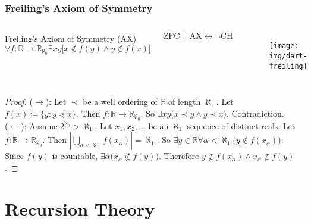 \documentclass[UTF8,11pt,colorlinks,compress,openany]{beamer}%
\begin{document}
\begin{frame}\frametitle{Freiling's Axiom of Symmetry}
\begin{columns}
\begin{block}{Freiling's Axiom of Symmetry (AX)}
\[\forall f:\mathbb{R}\to\mathbb{R}_{\aleph_0}\exists xy\big[x\notin f(y)\wedge y\notin f(x)\big]\]
\end{block}
\begin{theorem}
\[\mathrm{ZFC}\vdash \mathrm{AX}\leftrightarrow\neg \mathrm{CH}\]
\end{theorem}
	\begin{figure}
		\texttt{[image: img/dart-freiling]}
	\end{figure}
\end{columns}
\begin{proof}
($\to$): Let $\prec$ be a well ordering of $\mathbb{R}$ of length $\aleph_1$. Let $f(x)\coloneqq \{y: y\preceq x\}$. Then $f:\mathbb{R}\to\mathbb{R}_{\aleph_0}$. So $\exists xy\big(x\prec y\wedge y\prec x\big)$. Contradiction.\\
($\leftarrow$): Assume $2^{\aleph_0}>\aleph_1$. Let $x_1,x_2,\dots$ be an $\aleph_1$-sequence of distinct reals. Let $f: \mathbb{R}\to\mathbb{R}_{\aleph_0}$. Then $\left|\bigcup\limits_{\alpha<\aleph_1}f(x_\alpha)\right|=\aleph_1$. So $\exists y\in\mathbb{R}\forall \alpha<\aleph_1\big(y\notin f(x_\alpha)\big)$. Since $f(y)$ is countable, $\exists \alpha\big(x_\alpha\notin f(y)\big)$. Therefore $y\notin f(x_\alpha)\wedge x_\alpha\notin f(y)$.
\end{proof}
\end{frame}


\section{Recursion Theory}
\end{document}
